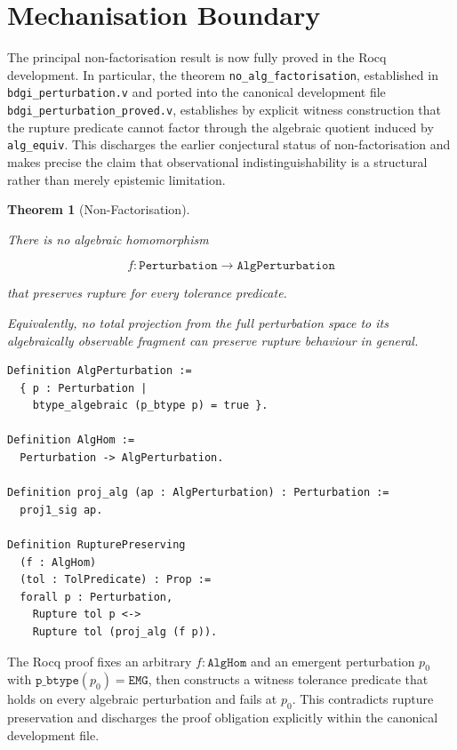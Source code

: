 \documentclass[12pt]{article}
\theoremstyle{plain}
\newtheorem{theorem}{Theorem}[section]
\theoremstyle{definition}
\theoremstyle{remark}
\begin{document}
\section{Mechanisation Boundary}
\label{sec:boundary}

The principal non-factorisation result is now fully proved in the Rocq
development.
In particular, the theorem \texttt{no\_alg\_factorisation},
established in \texttt{bdgi\_perturbation.v} and ported into the
canonical development file \texttt{bdgi\_perturbation\_proved.v},
establishes by explicit witness construction that the rupture
predicate cannot factor through the algebraic quotient induced by
\texttt{alg\_equiv}.
This discharges the earlier conjectural status of non-factorisation
and makes precise the claim that observational indistinguishability is
a structural rather than merely epistemic limitation.

\begin{theorem}[Non-Factorisation]
\label{thm:nonfact}

There is no algebraic homomorphism

\[
f :
\mathtt{Perturbation}
\to
\mathtt{AlgPerturbation}
\]

that preserves rupture for every tolerance predicate.

Equivalently, no total projection from the full perturbation space to
its algebraically observable fragment can preserve rupture behaviour
in general.

\end{theorem}

\begin{lstlisting}[style=rocq,
caption={Non-factorisation type signature.}]
Definition AlgPerturbation :=
  { p : Perturbation |
    btype_algebraic (p_btype p) = true }.

Definition AlgHom :=
  Perturbation -> AlgPerturbation.

Definition proj_alg (ap : AlgPerturbation) : Perturbation :=
  proj1_sig ap.

Definition RupturePreserving
  (f : AlgHom)
  (tol : TolPredicate) : Prop :=
  forall p : Perturbation,
    Rupture tol p <->
    Rupture tol (proj_alg (f p)).
\end{lstlisting}

The Rocq proof fixes an arbitrary $f : \mathtt{AlgHom}$ and an
emergent perturbation $p_0$ with
$\mathtt{p\_btype}(p_0) = \mathtt{EMG}$, then constructs a witness
tolerance predicate that holds on every algebraic perturbation and
fails at $p_0$.
This contradicts rupture preservation and discharges the proof
obligation explicitly within the canonical development file.
\end{document}
